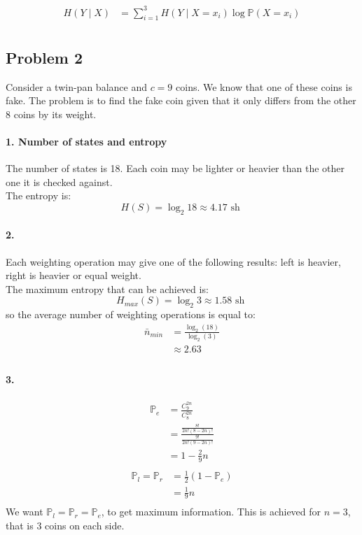 \documentclass{article}
\newcommand{\1}{\mathbf{1}}
\renewcommand{\P}{\mathbb{P}}
\begin{document}
\begin{align*}
  H(Y \mid X)
   & = \sum_{i=1}^3 H(Y \mid X = x_i) \log \P(X = x_i) \\
\end{align*}

\subsection{Problem 2}
Consider a twin-pan balance and $c = 9$ coins. We know that one of these coins is fake. The problem is to find the fake coin given that it only differs from the other 8 coins by its weight.

\paragraph{1. Number of states and entropy}
The number of states is 18. Each coin may be lighter or heavier than the other one it is checked against. \\
The entropy is:
$$
  H(S) = \log_2 18 \approx 4.17 \text{ sh }
$$

\paragraph{2.}
Each weighting operation may give one of the following results: left is heavier, right is heavier or equal weight. \\
The maximum entropy that can be achieved is:
$$
  H_{max}(S) = \log_2 3 \approx 1.58 \text{ sh }
$$
so the average number of weighting operations is equal to:
\begin{align*}
  \bar{n}_{min}
   & = \frac{\log_2(18)}{\log_2(3)} \\
   & \approx 2.63                   \\
\end{align*}

\paragraph{3.}
\begin{align*}
  \P_e
   & = \frac{C^{2n}_9}{C^{2n}_8}                               \\
   & = \frac{\frac{8!}{2n!(8 - 2n)!}}{\frac{9!}{2n!(9 - 2n)!}} \\
   & = 1 - \frac{2}{9}n                                        \\
\end{align*}
\begin{align*}
  \P_l = \P_r
   & = \frac{1}{2} (1 - \P_e) \\
   & = \frac{1}{9}n           \\
\end{align*}
We want $\P_l = \P_r = \P_e$, to get maximum information. This is achieved for $n = 3$, that is 3 coins on each side.
\end{document}
